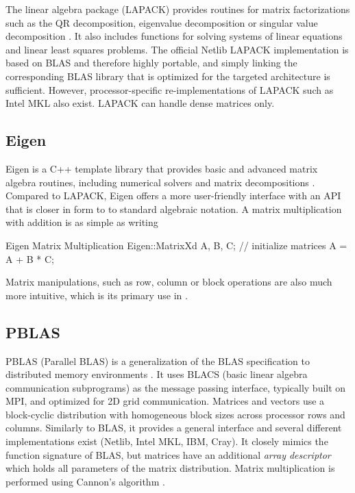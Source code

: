 The linear algebra package (LAPACK) provides routines for matrix factorizations such as the QR decomposition, eigenvalue decomposition or singular value decomposition \cite{LAP2021}. It also includes functions for solving systems of linear equations and linear least squares problems. The official Netlib LAPACK implementation is based on BLAS and therefore highly portable, and simply linking the corresponding BLAS library that is optimized for the targeted architecture is sufficient. However, processor-specific re-implementations of LAPACK such as Intel MKL also exist. LAPACK can handle dense matrices only. 

\subsection{Eigen}

Eigen is a C++ template library that provides basic and advanced matrix algebra routines, including numerical solvers and matrix decompositions \cite{Gue2010}. Compared to LAPACK, Eigen offers a more user-friendly interface with an API that is closer in form to to standard algebraic notation. A matrix multiplication with addition is as simple as writing
\begin{cpp}{Eigen Matrix Multiplication}
Eigen::MatrixXd A, B, C;
// initialize matrices
A = A + B * C;
\end{cpp}
\noindent Matrix manipulations, such as row, column or block operations are also much more intuitive, which is its primary use in \mchem{}.

\subsection{PBLAS}

PBLAS (Parallel BLAS) is a generalization of the BLAS specification to distributed memory environments \cite{PBLAS2021}. It uses BLACS (basic linear algebra communication subprograms) as the message passing interface, typically built on MPI, and optimized for 2D grid communication. Matrices and vectors use a block-cyclic distribution with homogeneous block sizes across processor rows and columns. Similarly to BLAS, it provides a general interface and several different implementations exist (Netlib, Intel MKL, IBM, Cray). It closely mimics the function signature of BLAS, but matrices have an additional \emph{array descriptor} which holds all parameters of the matrix distribution. Matrix multiplication is performed using Cannon's algorithm \cite{Can1969}.

